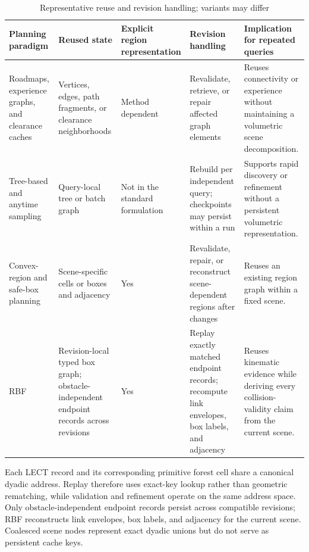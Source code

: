 \documentclass[journal]{IEEEtran}
\newcommand{\rbf}{RBF}
\begin{document}
\begin{table}[!t]
\centering
\caption{Representative reuse and revision handling; variants may differ}
\label{tab:related_qualitative_comparison}
\footnotesize
\setlength{\tabcolsep}{2.6pt}
\renewcommand{\arraystretch}{1.10}
\begin{tabular}{@{}M{0.17\textwidth}M{0.18\textwidth}M{0.14\textwidth}M{0.22\textwidth}M{0.23\textwidth}@{}}
\toprule
Planning paradigm & Reused state & Explicit region representation & Revision handling & Implication for repeated queries \\
\midrule
Roadmaps, experience graphs, and clearance caches & Vertices, edges, path fragments, or clearance neighborhoods & Method dependent & Revalidate, retrieve, or repair affected graph elements & Reuses connectivity or experience without maintaining a volumetric scene decomposition. \\
Tree-based and anytime sampling & Query-local tree or batch graph & Not in the standard formulation & Rebuild per independent query; checkpoints may persist within a run & Supports rapid discovery or refinement without a persistent volumetric representation. \\
Convex-region and safe-box planning & Scene-specific cells or boxes and adjacency & Yes & Revalidate, repair, or reconstruct scene-dependent regions after changes & Reuses an existing region graph within a fixed scene. \\
\rbf{} & Revision-local typed box graph; obstacle-independent endpoint records across revisions & Yes & Replay exactly matched endpoint records; recompute link envelopes, box labels, and adjacency & Reuses kinematic evidence while deriving every collision-validity claim from the current scene. \\
\bottomrule
\end{tabular}
\end{table}

Each LECT record and its corresponding primitive forest cell share a canonical
dyadic address. Replay therefore uses exact-key lookup rather than geometric
rematching, while validation and refinement operate on the same address space.
Only obstacle-independent endpoint records persist across compatible revisions;
\rbf{} reconstructs link envelopes, box labels, and adjacency for the current
scene. Coalesced scene nodes represent exact dyadic unions but do not serve as
persistent cache keys.
\end{document}
